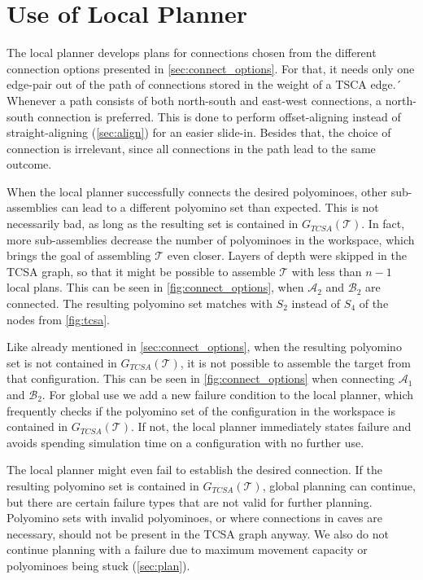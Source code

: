 
\section{Use of Local Planner}
\label{sec:local_in_global}

The local planner develops plans for connections chosen from the different connection options presented in \autoref{sec:connect_options}.
For that, it needs only one edge-pair out of the path of connections stored in the weight of a TSCA edge.´
Whenever a path consists of both north-south and east-west connections, a north-south connection is preferred.
This is done to perform offset-aligning instead of straight-aligning (\autoref{sec:align}) for an easier slide-in.
Besides that, the choice of connection is irrelevant, since all connections in the path lead to the same outcome.

When the local planner successfully connects the desired polyominoes, other sub-assemblies can lead to a different polyomino set than expected.
This is not necessarily bad, as long as the resulting set is contained in $G_{\textit{TCSA}}(\mathcal{T})$.
In fact, more sub-assemblies decrease the number of polyominoes in the workspace, which brings the goal of assembling $\mathcal{T}$ even closer.
Layers of depth were skipped in the TCSA graph, so that it might be possible to assemble $\mathcal{T}$ with less than $n-1$ local plans.
This can be seen in \autoref{fig:connect_options}, when $\mathcal{A}_2$ and $\mathcal{B}_2$ are connected. 
The resulting polyomino set matches with $S_2$ instead of $S_4$ of the nodes from \autoref{fig:tcsa}.

Like already mentioned in \autoref{sec:connect_options}, when the resulting polyomino set is not contained in $G_{\textit{TCSA}}(\mathcal{T})$, it is not possible to assemble the target from that configuration.
This can be seen in \autoref{fig:connect_options} when connecting $\mathcal{A}_1$ and $\mathcal{B}_2$.
For global use we add a new failure condition to the local planner, which frequently checks if the polyomino set of the configuration in the workspace is contained in $G_{\textit{TCSA}}(\mathcal{T})$.
If not, the local planner immediately states failure and avoids spending simulation time on a configuration with no further use.

\newpage

The local planner might even fail to establish the desired connection.
If the resulting polyomino set is contained in $G_{\textit{TCSA}}(\mathcal{T})$, global planning can continue, but there are certain failure types that are not valid for further planning.
Polyomino sets with invalid polyominoes, or where connections in caves are necessary, should not be present in the TCSA graph anyway.
We also do not continue planning with a failure due to maximum movement capacity or polyominoes being stuck (\autoref{sec:plan}).

